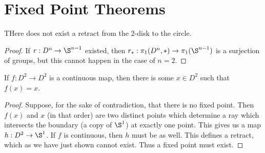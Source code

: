 
\section*{Fixed Point Theorems}

\begin{theorem}
	THere does not exist a retract from the 2-disk to the circle.
\end{theorem}

\begin{proof}
	
If $r:D^n\rightarrow \S^{n-1}$ existed, then $r_\ast:\pi_1(D^n,\ast)\rightarrow \pi_1(\S^{n-1})$ is a surjection of groups, but this cannot happen in the case of $n=2$.
	
\end{proof}


\begin{theorem}
	If $f:D^2\rightarrow D^2$ is a continuous map, then there is some $x\in D^2$ such that $f(x)=x$.
\end{theorem}

\begin{proof}
	Suppose, for the sake of contradiction, that there is no fixed point.  Then $f(x)$ and $x$ (in that order) are two distinct points which determine a ray which intersects the boundary (a copy of $\S^1$) at exactly one point.  This gives us a map $h:D^2\rightarrow \S^1$.  If $f$ is continuous, then $h$ must be as well.  This defines a retract, which as we have just shown cannot exist.  Thus a fixed point must exist.
\end{proof}


